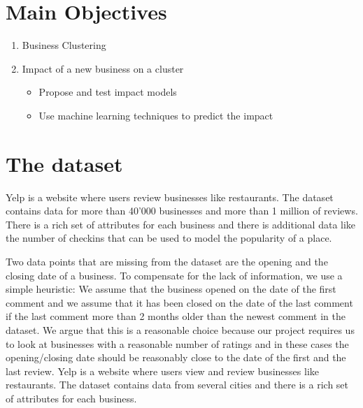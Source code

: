 \documentclass{vldb}
\begin{document}
\section*{Main Objectives}
\begin{enumerate}
\item Business Clustering
\item Impact of a new business on a cluster
	\begin{itemize}
 	 \item Propose and test impact models
 	 \item Use machine learning techniques to predict the impact
  	\end{itemize}
	
\end{enumerate}

\section{The dataset}

Yelp is a website where users review businesses like restaurants. The dataset contains data for more than 40’000 businesses and more than 1 million of reviews. There is a rich set of attributes for each business and there is additional data like the number of checkins that can be used to model the popularity of a place.

Two data points that are missing from the dataset are the opening and the closing date of a business.
To compensate for the lack of information, we use a simple heuristic: We assume that the business opened on the date of the first comment and we assume that it has been closed on the date of the last comment if the last comment more than 2 months older than the newest comment in the dataset.
We argue that this is a reasonable choice because our project requires us to look at businesses with a reasonable number of ratings and in these cases the opening/closing date should be reasonably close to the date of the first and the last review.
Yelp is a website where users view and review businesses like restaurants. The dataset contains data from several cities and there is a rich set of attributes for each business. \\
\end{document}
